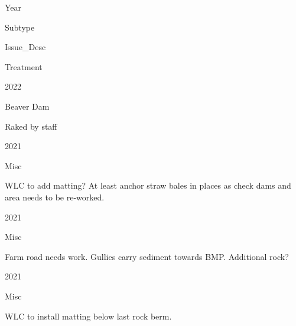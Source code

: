 \documentclass[
  landscape]{article}
\begin{document}
Year

Subtype

Issue\_Desc

Treatment

2022

Beaver Dam

Raked by staff

2021

Misc

WLC to add matting? At least anchor straw bales in places as check dams
and area needs to be re-worked.

2021

Misc

Farm road needs work. Gullies carry sediment towards BMP. Additional
rock?

2021

Misc

WLC to install matting below last rock berm.
\end{document}
